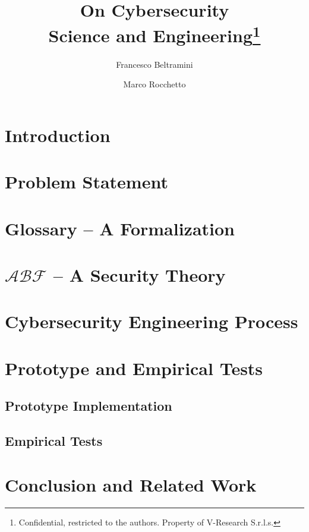 \documentclass{article}
\date{}                     %
\theoremstyle{definition}
\theoremstyle{corollary}
\theoremstyle{lemma}
\theoremstyle{theorem}
\theoremstyle{theorem}
\newcommand{\assertionRegion}{\mathcal{A}}
\newcommand{\behaviorRegion}{\mathcal{B}}
\newcommand{\factRegion}{\mathcal{F}}
\begin{document}
\title{On Cybersecurity\\Science and Engineering\footnote{Confidential, restricted to the authors. Property of V-Research S.r.l.s.}}
\author[1]{Francesco Beltramini}
\author[1]{Marco Rocchetto}

\maketitle

\begin{abstract}
 
\end{abstract}
\newpage

\section{Introduction}\label{sec:intro}


\section{Problem Statement}\label{sec:problem}


\section{Glossary -- A Formalization}\label{sec:glossary}


\section{$\assertionRegion\behaviorRegion\factRegion$ -- A Security Theory}\label{sec:theory}


\section{Cybersecurity Engineering Process}\label{sec:process}


\section{Prototype and Empirical Tests}\label{sec:prototest}
\subsection{Prototype Implementation}\label{sec:implementation}
\subsection{Empirical Tests}\label{sec:tests}

\section{Conclusion and Related Work}\label{sec:related}

\printbibliography
\end{document}
